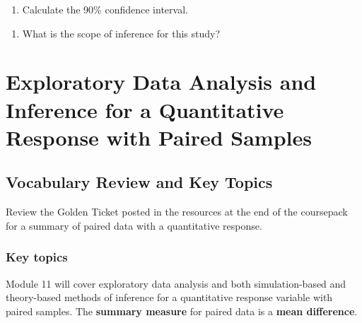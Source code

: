 \documentclass[
]{report}
\providecommand{\tightlist}{%
  \setlength{\itemsep}{0pt}\setlength{\parskip}{0pt}}
\begin{document}
\begin{enumerate}
\def\labelenumi{\arabic{enumi}.}
\setcounter{enumi}{18}
\tightlist
\item
  Calculate the 90\% confidence interval.
\end{enumerate}

\vspace{1in}

\begin{enumerate}
\def\labelenumi{\arabic{enumi}.}
\setcounter{enumi}{19}
\tightlist
\item
  What is the scope of inference for this study?
\end{enumerate}

\newpage

\chapter{Exploratory Data Analysis and Inference for a Quantitative Response with Paired Samples}\label{exploratory-data-analysis-and-inference-for-a-quantitative-response-with-paired-samples}

\section{Vocabulary Review and Key Topics}\label{vocabulary-review-and-key-topics-8}

Review the Golden Ticket posted in the resources at the end of the coursepack for a summary of paired data with a quantitative response.

\subsection{Key topics}\label{key-topics-10}

Module 11 will cover exploratory data analysis and both simulation-based and theory-based methods of inference for a quantitative response variable with paired samples. The \textbf{summary measure} for paired data is a \textbf{mean difference}.
\end{document}
